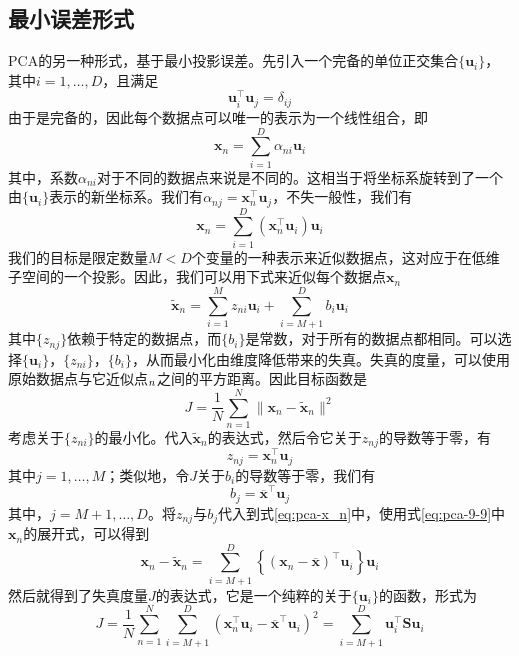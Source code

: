 \documentclass[11pt]{ctexbook}
\begin{document}
\subsection{最小误差形式}
PCA的另一种形式，基于最小投影误差。先引入一个完备的单位正交集合$\{\bm u_i\}$，其中$i=1, \ldots, D$，且满足
\begin{equation}
	\bm u_i^\top \bm u_j = \delta_{ij}
\end{equation}
由于是完备的，因此每个数据点可以唯一的表示为一个线性组合，即
\begin{equation}
	\bm x_n = \sum_{i=1}^{D}\alpha_{ni}\bm u_i
\end{equation}
其中，系数$\alpha_{ni}$对于不同的数据点来说是不同的。这相当于将坐标系旋转到了一个由$\{\bm u_i\}$表示的新坐标系。我们有$\alpha_{nj} = \bm x_n^\top \bm u_j$，不失一般性，我们有
\begin{equation}
	\label{eq:pca-9-9}
	\bm x_n = \sum_{i=1}^{D}(\bm x_n^\top \bm u_i)\bm u_i
\end{equation}
我们的目标是限定数量$M<D$个变量的一种表示来近似数据点，这对应于在低维子空间的一个投影。因此，我们可以用下式来近似每个数据点$\bm x_n$
\begin{equation}
	\label{eq:pca-x_n}
	\tilde{\bm x}_n = \sum_{i=1}^{M}z_{ni}\bm u_i + \sum_{i=M+1}^{D}b_i\bm u_i
\end{equation}
其中$\{z_{nj}\}$依赖于特定的数据点，而$\{b_i\}$是常数，对于所有的数据点都相同。可以选择$\{\bm u_i\}$，$\{z_{ni}\}$，$\{b_i\}$，从而最小化由维度降低带来的失真。失真的度量，可以使用原始数据点与它近似点$\title{\bm x}_n$之间的平方距离。因此目标函数是
\begin{equation}
	J = \frac{1}{N}\sum_{n=1}^{N}\|\bm x_n - \tilde{\bm x}_n \|^2
\end{equation}
考虑关于$\{z_{ni}\}$的最小化。代入$\tilde{\bm x}_n$的表达式，然后令它关于$z_{nj}$的导数等于零，有
\begin{equation}
	z_{nj} = \bm x_n^\top\bm u_j
\end{equation}
其中$j=1, \ldots, M$；类似地，令$J$关于$b_i$的导数等于零，我们有
\begin{equation}
	b_j = \overline{\bm x}^\top\bm u_j
\end{equation}
其中，$j=M+1, \ldots, D$。将$z_{nj}$与$b_j$代入到式\ref{eq:pca-x_n}中，使用式\ref{eq:pca-9-9}中$\bm x_n$的展开式，可以得到
\begin{equation}
	\bm x_n - \tilde{\bm x}_n= \sum_{i=M+1}^{D}\left\{ (\bm x_n - \overline{\bm x})^\top \bm u_i\right\} \bm u_i
\end{equation}
然后就得到了失真度量$J$的表达式，它是一个纯粹的关于$\{\bm u_i\}$的函数，形式为
\begin{equation}
	J = \frac{1}{N}\sum_{n=1}^{N}\sum_{i=M+1}^{D}(\bm x_n^\top\bm u_i - \overline{\bm x}^\top\bm u_i)^2  = \sum_{i=M+1}^{D}\bm u_i^\top\bm S\bm u_i
\end{equation}
\end{document}
